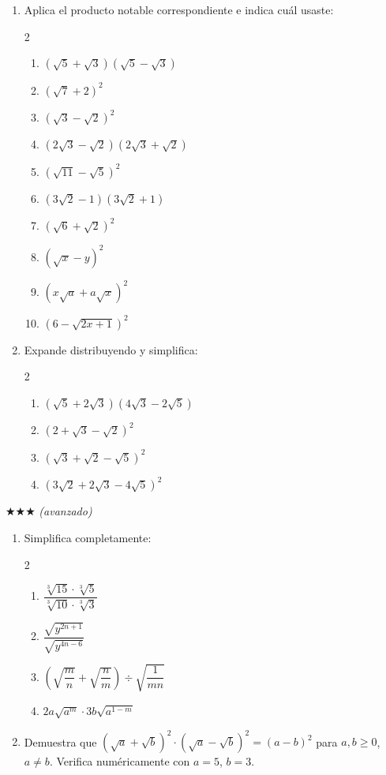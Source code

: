 \documentclass[11pt, letterpaper]{article}
\begin{document}
\begin{enumerate}[label=\textbf{\arabic*.}, leftmargin=*, resume]
  \item Aplica el producto notable correspondiente e indica cuál usaste:
  \begin{multicols}{2}
  \begin{enumerate}[label=\alph*)]
    \item $(\sqrt{5}+\sqrt{3})(\sqrt{5}-\sqrt{3})$
    \item $(\sqrt{7}+2)^2$
    \item $(\sqrt{3}-\sqrt{2})^2$
    \item $(2\sqrt{3}-\sqrt{2})(2\sqrt{3}+\sqrt{2})$
    \item $(\sqrt{11}-\sqrt{5})^2$
    \item $(3\sqrt{2}-1)(3\sqrt{2}+1)$
    \item $(\sqrt{6}+\sqrt{2})^2$
    \item $(\sqrt{x}-y)^2$
    \item $(x\sqrt{a}+a\sqrt{x})^2$
    \item $(6-\sqrt{2x+1})^2$
  \end{enumerate}
  \end{multicols}

  \item Expande distribuyendo y simplifica:
  \begin{multicols}{2}
  \begin{enumerate}[label=\alph*)]
    \item $(\sqrt{5}+2\sqrt{3})(4\sqrt{3}-2\sqrt{5})$
    \item $(2+\sqrt{3}-\sqrt{2})^2$
    \item $(\sqrt{3}+\sqrt{2}-\sqrt{5})^2$
    \item $(3\sqrt{2}+2\sqrt{3}-4\sqrt{5})^2$
  \end{enumerate}
  \end{multicols}
\end{enumerate}

$\bigstar\bigstar\bigstar$ \textit{(avanzado)}

\begin{enumerate}[label=\textbf{\arabic*.}, leftmargin=*, resume]
  \item Simplifica completamente:
  \begin{multicols}{2}
  \begin{enumerate}[label=\alph*)]
    \item $\dfrac{\sqrt[3]{15}\cdot\sqrt[3]{5}}{\sqrt[3]{10}\cdot\sqrt[3]{3}}$
    \item $\dfrac{\sqrt{y^{2n+1}}}{\sqrt{y^{4n-6}}}$
    \item $\left(\sqrt{\dfrac{m}{n}}+\sqrt{\dfrac{n}{m}}\right)\div\sqrt{\dfrac{1}{mn}}$
    \item $2a\sqrt{a^m}\cdot 3b\sqrt{a^{1-m}}$
  \end{enumerate}
  \end{multicols}

  \item Demuestra que $(\sqrt{a}+\sqrt{b})^2 \cdot (\sqrt{a}-\sqrt{b})^2 = (a-b)^2$ para $a,b \geq 0$, $a \neq b$. Verifica numéricamente con $a=5$, $b=3$.
\end{enumerate}
\end{document}

